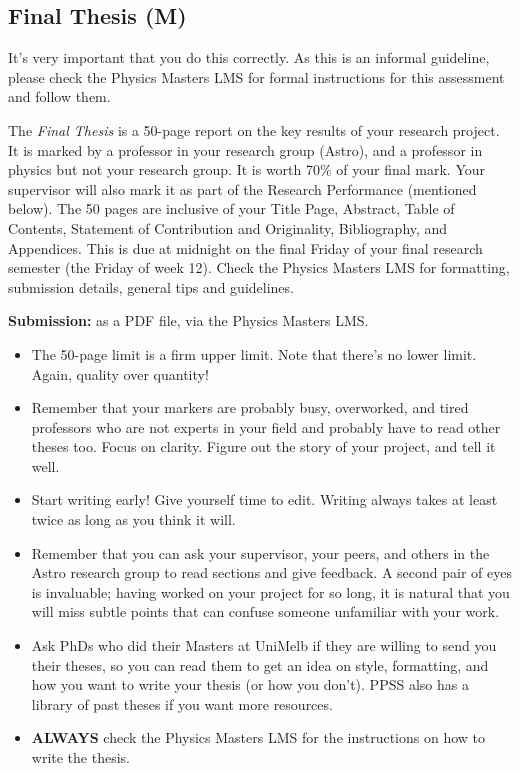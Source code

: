 \documentclass[11pt, oneside, a4paper]{article}
\newcommand{\tipscolor}{ForestGreen}
\begin{document}
\subsection*{Final Thesis (M)}\label{Thesis}

\begin{tcolorbox}[colback=red!5!white,colframe=red!50!white,title={IMPORTANT}]
    It's very important that you do this correctly. As this is an informal guideline, please check the Physics Masters LMS for formal instructions for this assessment and follow them. 
\end{tcolorbox}
 

The \textit{Final Thesis} is a 50-page report on the key results of your research project. 
It is marked by a professor in your research group (Astro), and a professor in physics but not your research group. 
It is worth 70\% of your final mark.
Your supervisor will also mark it as part of the Research Performance (mentioned below). 
The 50 pages are inclusive of your Title Page, Abstract, Table of Contents, Statement of Contribution and Originality, Bibliography, and Appendices.
This is due at midnight on the final Friday of your final research semester (the Friday of week 12). 
Check the Physics Masters LMS for formatting, submission details, general tips and guidelines. 

\noindent
\textbf{Submission:} as a PDF file, via the Physics Masters LMS.


\begin{tcolorbox}[colback=\tipscolor!5!white,colframe=\tipscolor!50!white,title={Tips \& Tricks}]
    \begin{itemize}
        \item The 50-page limit is a firm upper limit. Note that there's no lower limit. Again, quality over quantity!
        \item Remember that your markers are probably busy, overworked, and tired professors who are not experts in your field and probably have to read other theses too. 
        Focus on clarity.
        Figure out the story of your project, and tell it well.  
        \item Start writing early! Give yourself time to edit. Writing always takes at least twice as long as you think it will. 
        \item Remember that you can ask your supervisor, your peers, and others in the Astro research group to read sections and give feedback. 
        A second pair of eyes is invaluable; having worked on your project for so long, it is natural that you will miss subtle points that can confuse someone unfamiliar with your work. 
        \item Ask PhDs who did their Masters at UniMelb if they are willing to send you their theses, so you can read them to get an idea on style, formatting, and how you want to write your thesis (or how you don't). PPSS also has a library of past theses if you want more resources. 
        \item \textbf{ALWAYS} check the Physics Masters LMS for the instructions on how to write the thesis. 
    \end{itemize}
\end{tcolorbox}
\end{document}
